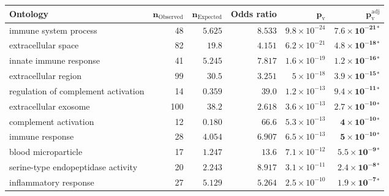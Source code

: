 \documentclass{article}
\begin{document}
    \begin{table*}[!ht]
        \centering
    \begin{adjustbox}{width = 1\textwidth}
            \small
            \begin{tabular}{|l|r|r|r|r|r|}
                \toprule
                \textbf{Ontology} &
                $\bm{n_{\mathrm{Observed}}}$ &
                $\bm{n_{\mathrm{Expected}}}$ &
                \textbf{Odds ratio} &
                $\bm{p_{\mathrm{v}}}$ &
                $\bm{p_{\mathrm{v}}^{\mathrm{adj}}}$ \\
                \midrule
                immune system process                             & 48  & $ 5.625$ & $ 8.533$ & $9.8\times 10^{-24}$ & $\bm{7.6\times 10^{-21}{^*}}$ \\
                extracellular space                               & 82  & $  19.8$   & $ 4.151$ & $6.2\times 10^{-21}$ & $\bm{4.8\times 10^{-18}{^*}}$ \\
                innate immune response                            & 41  & $ 5.245$ & $ 7.817$ & $1.6\times 10^{-19}$ & $\bm{1.2\times 10^{-16}{^*}}$ \\
                extracellular region                              & 99  & $  30.5$   & $ 3.251$ & $ 5\times 10^{-18}$  & $\bm{3.9\times 10^{-15}{^*}}$ \\
                regulation of complement activation               & 14  & $ 0.359$ & $  39.0$   & $1.2\times 10^{-13}$ & $\bm{9.4\times 10^{-11}{^*}}$ \\
                extracellular exosome                             & 100 & $  38.2$   & $ 2.618$ & $3.6\times 10^{-13}$ & $\bm{2.7\times 10^{-10}{^*}}$ \\
                complement activation                             & 12  & $ 0.180$ & $  66.6$   & $5.3\times 10^{-13}$ & $\bm{ 4\times 10^{-10}{^*}}$  \\
                immune response                                   & 28  & $ 4.054$ & $ 6.907$ & $6.5\times 10^{-13}$ & $\bm{ 5\times 10^{-10}{^*}}$  \\
                blood microparticle                               & 17  & $ 1.247$ & $  13.6$   & $7.1\times 10^{-12}$ & $\bm{5.5\times 10^{-9}{^*}}$  \\
                serine-type endopeptidase activity                & 20  & $ 2.243$ & $ 8.917$ & $3.1\times 10^{-11}$ & $\bm{2.4\times 10^{-8}{^*}}$  \\
                inflammatory response                             & 27  & $ 5.129$ & $ 5.264$ & $2.5\times 10^{-10}$ & $\bm{1.9\times 10^{-7}{^*}}$  \\

\end{tabular}
\end{adjustbox}
\end{table*}
\end{document}
